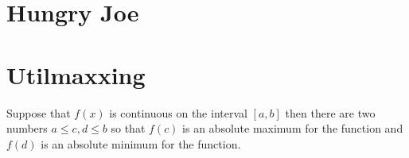 
\setcounter{chapter}{0}
\chapter{Hungry Joe}


\setcounter{chapter}{1}
\chapter{Utilmaxxing}

\begin{theorem}
	Suppose that \(f\left( x \right)\) is continuous on the interval \(\left[ {a,b} \right]\) then there are two numbers \(a \le c,d \le b\) so that \(f\left( c \right)\) is an absolute maximum for the function and \(f\left( d \right)\) is an absolute minimum for the function.
\end{theorem}